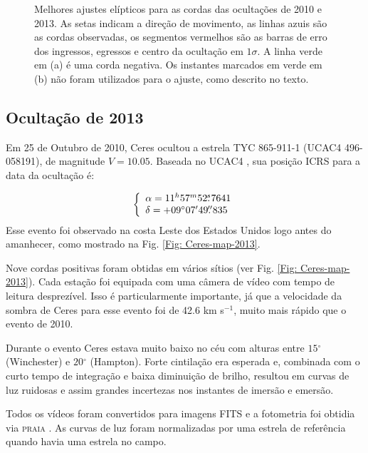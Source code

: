 \documentclass[12pt,a4paper]{monografia}
\newcommand{\degr}{\ensuremath{^{\circ}}}%
\newcommand{\arcmin}{\ensuremath{^{\prime}}}%
\newcommand{\fs}{\mbox{\ensuremath{.\!\!^s}}}
\newcommand{\farcs}{\mbox{\ensuremath{.\!\!^{\prime\prime}}}}%
\begin{document}
\begin{figure}[h]
\begin{centering}
\caption{Melhores ajustes elípticos para as cordas das ocultações de 2010 e 2013. As setas indicam a direção de movimento, as linhas azuis são as cordas observadas, os segmentos vermelhos são as barras de erro dos ingressos, egressos e centro da ocultação em $1\sigma$. A linha verde em (a) é uma corda negativa. Os instantes marcados em verde em (b) não foram utilizados para o ajuste, como descrito no texto.
\label{Fig: Ceres-limb}}
\end{centering}
\end{figure}


\subsection{Ocultação de 2013}
\label{Subsec: 2013-occ}

\indent \indent Em 25 de Outubro de 2010, Ceres ocultou a estrela TYC 865-911-1 (UCAC4 496-058191), de magnitude $V = 10.05$. Baseada no UCAC4 \citep{Zacharias2013}, sua posição ICRS para a data da ocultação é:

%
\begin{equation}
\left\{ 
  \begin{array}{l l}
    \alpha = 11^{h}57^{m}52\fs7641\\
    \delta = +09\degr 07\arcmin 49\farcs835
  \end{array}
\right.
\end{equation}
%
Esse evento foi observado na costa Leste dos Estados Unidos logo antes do amanhecer, como mostrado na Fig. \ref{Fig: Ceres-map-2013}.

Nove cordas positivas foram obtidas em vários sítios (ver Fig. \ref{Fig: Ceres-map-2013}). Cada estação foi equipada com uma câmera de vídeo com tempo de leitura desprezível. Isso é particularmente importante, já que a velocidade da sombra de Ceres para esse evento foi de 42.6 km s$^{-1}$, muito mais rápido que o evento de 2010.

Durante o evento Ceres estava muito baixo no céu com alturas entre $15\degr$ (Winchester) e $20\degr$ (Hampton). Forte cintilação era esperada e, combinada com o curto tempo de integração e baixa diminuição de brilho, resultou em curvas de luz ruidosas e assim grandes incertezas nos instantes de imersão e emersão.

Todos os vídeos foram convertidos para imagens FITS e a fotometria foi obtidia via \textsc{praia} \cite{Assafin2011}. As curvas de luz foram normalizadas por uma estrela de referência quando havia uma estrela no campo.
\end{document}
